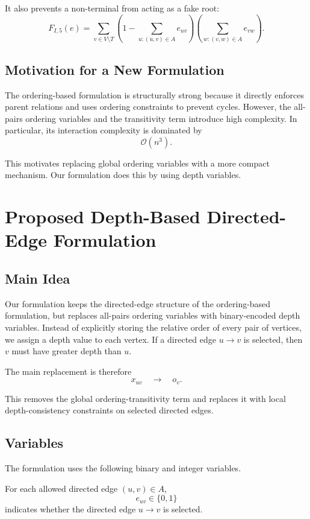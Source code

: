 \documentclass[a4paper,12pt]{report}
\begin{document}
It also prevents a non-terminal from acting as a fake root:
\[
F_{I,5}(e)
=
\sum_{v\in V\setminus T}
\left(
1-\sum_{u:(u,v)\in A}e_{uv}
\right)
\left(
\sum_{w:(v,w)\in A}e_{vw}
\right).
\]

\subsection{Motivation for a New Formulation}

The ordering-based formulation is structurally strong because it directly enforces parent relations and uses ordering constraints to prevent cycles. However, the all-pairs ordering variables and the transitivity term introduce high complexity. In particular, its interaction complexity is dominated by
\[
\mathcal{O}(n^3).
\]

This motivates replacing global ordering variables with a more compact mechanism. Our formulation does this by using depth variables.

\section{Proposed Depth-Based Directed-Edge Formulation}

\subsection{Main Idea}

Our formulation keeps the directed-edge structure of the ordering-based formulation, but replaces all-pairs ordering variables with binary-encoded depth variables. Instead of explicitly storing the relative order of every pair of vertices, we assign a depth value to each vertex. If a directed edge \(u\to v\) is selected, then \(v\) must have greater depth than \(u\).

The main replacement is therefore
\[
x_{uv}
\quad \longrightarrow \quad
o_v.
\]

This removes the global ordering-transitivity term and replaces it with local depth-consistency constraints on selected directed edges.

\subsection{Variables}

The formulation uses the following binary and integer variables.

For each allowed directed edge \((u,v)\in A\),
\[
e_{uv}\in\{0,1\}
\]
indicates whether the directed edge \(u\to v\) is selected.
\end{document}
